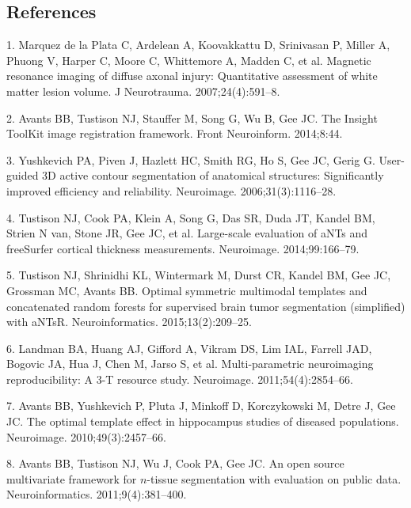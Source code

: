 \documentclass[12pt,]{article}
\begin{document}
\clearpage

\subsection*{References}\label{references}

\hypertarget{refs}{}
\hypertarget{ref-Marquez-de-la-Plata:2007aa}{}
1. Marquez de la Plata C, Ardelean A, Koovakkattu D, Srinivasan P,
Miller A, Phuong V, Harper C, Moore C, Whittemore A, Madden C, et al.
Magnetic resonance imaging of diffuse axonal injury: Quantitative
assessment of white matter lesion volume. J Neurotrauma.
2007;24(4):591--8.

\hypertarget{ref-Avants:2014aa}{}
2. Avants BB, Tustison NJ, Stauffer M, Song G, Wu B, Gee JC. The Insight
ToolKit image registration framework. Front Neuroinform. 2014;8:44.

\hypertarget{ref-Yushkevich:2006aa}{}
3. Yushkevich PA, Piven J, Hazlett HC, Smith RG, Ho S, Gee JC, Gerig G.
User-guided 3D active contour segmentation of anatomical structures:
Significantly improved efficiency and reliability. Neuroimage.
2006;31(3):1116--28.

\hypertarget{ref-Tustison:2014ab}{}
4. Tustison NJ, Cook PA, Klein A, Song G, Das SR, Duda JT, Kandel BM,
Strien N van, Stone JR, Gee JC, et al. Large-scale evaluation of aNTs
and freeSurfer cortical thickness measurements. Neuroimage.
2014;99:166--79.

\hypertarget{ref-Tustison:2015aa}{}
5. Tustison NJ, Shrinidhi KL, Wintermark M, Durst CR, Kandel BM, Gee JC,
Grossman MC, Avants BB. Optimal symmetric multimodal templates and
concatenated random forests for supervised brain tumor segmentation
(simplified) with aNTsR. Neuroinformatics. 2015;13(2):209--25.

\hypertarget{ref-landman2011}{}
6. Landman BA, Huang AJ, Gifford A, Vikram DS, Lim IAL, Farrell JAD,
Bogovic JA, Hua J, Chen M, Jarso S, et al. Multi-parametric neuroimaging
reproducibility: A 3-T resource study. Neuroimage. 2011;54(4):2854--66.

\hypertarget{ref-Avants:2010aa}{}
7. Avants BB, Yushkevich P, Pluta J, Minkoff D, Korczykowski M, Detre J,
Gee JC. The optimal template effect in hippocampus studies of diseased
populations. Neuroimage. 2010;49(3):2457--66.

\hypertarget{ref-Avants:2011aa}{}
8. Avants BB, Tustison NJ, Wu J, Cook PA, Gee JC. An open source
multivariate framework for \(n\)-tissue segmentation with evaluation on
public data. Neuroinformatics. 2011;9(4):381--400.
\end{document}
